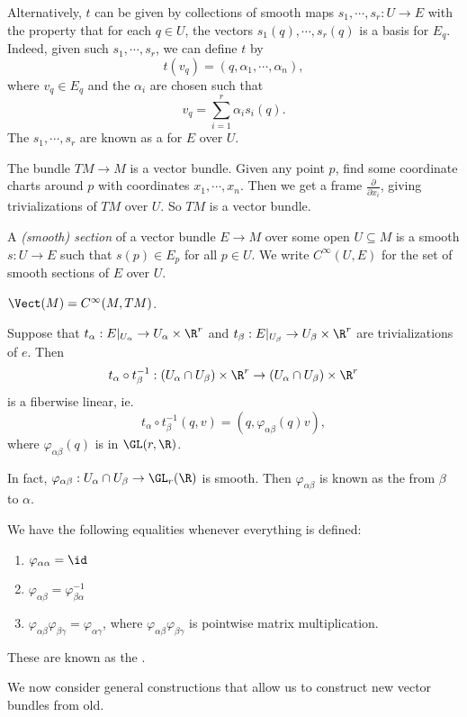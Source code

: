 \documentclass[a4paper]{article}
\begin{document}
Alternatively, $t$ can be given by collections of smooth maps $s_1, \cdots, s_r: U \to E$ with the property that for each $q \in U$, the vectors $s_1(q), \cdots, s_r(q)$ is a basis for $E_q$. Indeed, given such $s_1, \cdots, s_r$, we can define $t$ by
\[
  t(v_q) = (q, \alpha_1, \cdots, \alpha_n),
\]
where $v_q \in E_q$ and the $\alpha_i$ are chosen such that
\[
  v_q = \sum_{i = 1}^r \alpha_i s_i(q).
\]
The $s_1, \cdots, s_r$ are known as a  for $E$ over $U$.

\begin{eg}
  The bundle $TM \to M$ is a vector bundle. Given any point $p$, find some coordinate charts around $p$ with coordinates $x_1, \cdots, x_n$. Then we get a frame $\frac{\partial}{\partial x_i}$, giving trivializations of $TM$ over $U$. So $TM$ is a vector bundle.
\end{eg}

\begin{defi}[Section]
  A \emph{(smooth) section} of a vector bundle $E \to M$ over some open $U \subseteq M$ is a smooth $s: U \to E$ such that $s(p) \in E_p$ for all $p \in U$. We write $C^\infty(U, E)$ for the set of smooth sections of $E$ over $U$.
\end{defi}

\begin{eg}
  $\Vect(M) = C^\infty (M, TM)$.
\end{eg}

\begin{defi}
  Suppose that $t_\alpha: E|_{U_\alpha} \to U_\alpha \times \R^r$ and $t_\beta: E|_{U_\beta} \to U_\beta \times \R^r$ are trivializations of $e$. Then
  \[
    t_\alpha \circ t_\beta^{-1} : (U_\alpha \cap U_\beta) \times \R^r \to (U_\alpha \cap U_\beta) \times \R^r
  \]
  is a fiberwise linear, ie.
  \[
    t_\alpha \circ t_\beta^{-1}(q, v) = (q, \varphi_{\alpha\beta}(q) v),
  \]
  where $\varphi_{\alpha\beta}(q)$ is in $\GL(r, \R)$.

  In fact, $\varphi_{\alpha\beta}: U_\alpha \cap U_\beta \to \GL_r(\R)$ is smooth. Then $\varphi_{\alpha\beta}$ is known as the  from $\beta$ to $\alpha$.
\end{defi}

\begin{prop}
  We have the following equalities whenever everything is defined:
  \begin{enumerate}
    \item $\varphi_{\alpha\alpha} = \id$
    \item $\varphi_{\alpha\beta} = \varphi_{\beta\alpha}^{-1}$
    \item $\varphi_{\alpha\beta}\varphi_{\beta\gamma} = \varphi_{\alpha\gamma}$, where $\varphi_{\alpha\beta} \varphi_{\beta\gamma}$ is pointwise matrix multiplication.
  \end{enumerate}
  These are known as the .
\end{prop}
We now consider general constructions that allow us to construct new vector bundles from old.
\end{document}
